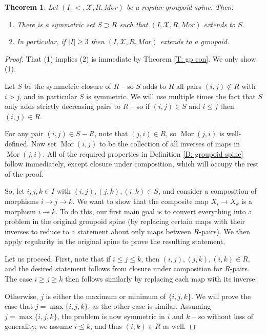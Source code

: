 \documentclass{amsart}
\newtheorem{theorem}{Theorem}[section]
\theoremstyle{definition}
\begin{document}
\begin{theorem}\label{T: regular gp con}
  Let $(I,<,\mathcal X,R,Mor)$ be a regular groupoid spine. Then:
  \begin{enumerate}
      \item There is a symmetric set $S\supset R$ such that $(I,\mathcal X,R,Mor)$ extends to $S$.
      \item In particular, if $|I|\geq 3$ then $(I,\mathcal X,R,Mor)$ extends to a groupoid.
  \end{enumerate}
\end{theorem}
\begin{proof}
    That (1) implies (2) is immediate by Theorem \ref{T: gp con}. We only show (1).

    Let $S$ be the symmetric closure of $R$ -- so $S$ adds to $R$ all pairs $(i,j)\notin R$ with $i>j$, and in particular $S$ is symmetric. We will use multiple times the fact that $S$ only adds strictly decreasing pairs to $R$ -- so if $(i,j)\in S$ and $i\leq j$ then $(i,j)\in R$.
    
    For any pair $(i,j)\in S-R$, note that $(j,i)\in R$, so $\operatorname{Mor}(j,i)$ is well-defined. Now set $\operatorname{Mor}(i,j)$ to be the collection of all inverses of maps in $\operatorname{Mor}(j,i)$. All of the required properties in Definition \ref{D: groupoid spine} follow immediately, except closure under composition, which will occupy the rest of the proof.

    So, let $i,j,k\in I$ with $(i,j),(j,k),(i,k)\in S$, and consider a composition of morphisms $i\rightarrow j\rightarrow k$. We want to show that the composite map $X_i\rightarrow X_k$ is a morphism $i\rightarrow k$. To do this, our first main goal is to convert everything into a problem in the original groupoid spine (by replacing certain maps with their inverses to reduce to a statement about only maps between $R$-pairs). We then apply regularity in the original spine to prove the resulting statement.

    Let us proceed. First, note that if $i\leq j\leq k$, then $(i,j),(j,k),(i,k)\in R$, and the desired statement follows from closure under composition for $R$-pairs. The case $i\geq j\geq k$ then follows similarly by replacing each map with its inverse.

    Otherwise, $j$ is either the maximum or minimum of $\{i,j,k\}$. We will prove the case that $j=\max\{i,j,k\}$, as the other case is similar.  Assuming $j=\max\{i,j,k\}$, the problem is now symmetric in $i$ and $k$ -- so without loss of generality, we assume $i\leq k$, and thus $(i,k)\in R$ as well.
    

\end{proof}
\end{document}
